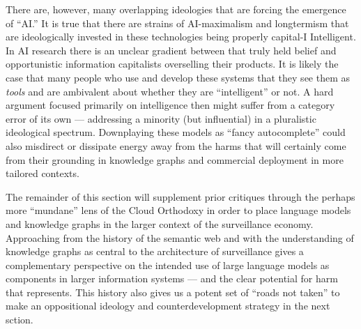 There are, however, many overlapping ideologies that are forcing the
emergence of ``AI.'' It is true that there are strains of AI-maximalism
and longtermism that are ideologically invested in these technologies being
properly capital-I Intelligent. In AI research there is an unclear
gradient between that truly held belief and opportunistic information
capitalists overselling their products. It is likely
the case that many people who use and develop these systems that they
see them as \emph{tools} and are ambivalent about whether they are
``intelligent'' or not. A hard argument focused primarily on
intelligence then might suffer from a category error of its own ---
addressing a minority (but influential) in a pluralistic ideological
spectrum. Downplaying these models as ``fancy autocomplete'' could also
misdirect or dissipate energy away from the harms that will certainly
come from their grounding in knowledge graphs and commercial deployment
in more tailored contexts.

The remainder of this section will supplement prior critiques through
the perhaps more ``mundane'' lens of the Cloud Orthodoxy in order to
place language models and knowledge graphs in the larger context of the
surveillance economy. Approaching from the history of the semantic web
and with the understanding of knowledge graphs as central to the
architecture of surveillance gives a complementary perspective on the
intended use of large language models as components in larger
information systems --- and the clear potential for harm that
represents. This history also gives us a potent set of ``roads not
taken'' to make an oppositional ideology and counterdevelopment strategy
in the next sction.

